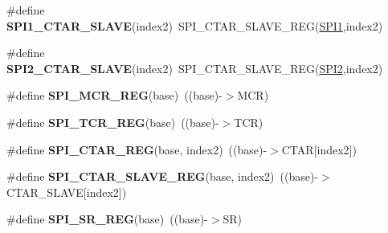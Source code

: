 \begin{DoxyCompactItemize}
\item 
\#define {\bfseries S\+P\+I1\+\_\+\+C\+T\+A\+R\+\_\+\+S\+L\+A\+VE}(index2)~S\+P\+I\+\_\+\+C\+T\+A\+R\+\_\+\+S\+L\+A\+V\+E\+\_\+\+R\+EG(\hyperlink{group__SPI__Peripheral__Access__Layer_gad483be344a28ac800be8f03654a9612f}{S\+P\+I1},index2)\hypertarget{group__SPI__Register__Accessor__Macros_ga361579ce18b530b397c5de3ac7f0901d}{}\label{group__SPI__Register__Accessor__Macros_ga361579ce18b530b397c5de3ac7f0901d}

\item 
\#define {\bfseries S\+P\+I2\+\_\+\+C\+T\+A\+R\+\_\+\+S\+L\+A\+VE}(index2)~S\+P\+I\+\_\+\+C\+T\+A\+R\+\_\+\+S\+L\+A\+V\+E\+\_\+\+R\+EG(\hyperlink{group__SPI__Peripheral__Access__Layer_gaf2c3d8ce359dcfbb2261e07ed42af72b}{S\+P\+I2},index2)\hypertarget{group__SPI__Register__Accessor__Macros_ga22f28ca15ffb5162a59cb82e4ff460fd}{}\label{group__SPI__Register__Accessor__Macros_ga22f28ca15ffb5162a59cb82e4ff460fd}

\item 
\#define {\bfseries S\+P\+I\+\_\+\+M\+C\+R\+\_\+\+R\+EG}(base)~((base)-\/$>$M\+CR)\hypertarget{group__SPI__Register__Accessor__Macros_ga02f3e3aa90fc1cdfb071320ce19987ac}{}\label{group__SPI__Register__Accessor__Macros_ga02f3e3aa90fc1cdfb071320ce19987ac}

\item 
\#define {\bfseries S\+P\+I\+\_\+\+T\+C\+R\+\_\+\+R\+EG}(base)~((base)-\/$>$T\+CR)\hypertarget{group__SPI__Register__Accessor__Macros_ga59171d40915f579f0444e2036c67d9f5}{}\label{group__SPI__Register__Accessor__Macros_ga59171d40915f579f0444e2036c67d9f5}

\item 
\#define {\bfseries S\+P\+I\+\_\+\+C\+T\+A\+R\+\_\+\+R\+EG}(base,  index2)~((base)-\/$>$C\+T\+AR\mbox{[}index2\mbox{]})\hypertarget{group__SPI__Register__Accessor__Macros_gacbd9cd0fec440c317a022bcf3648af57}{}\label{group__SPI__Register__Accessor__Macros_gacbd9cd0fec440c317a022bcf3648af57}

\item 
\#define {\bfseries S\+P\+I\+\_\+\+C\+T\+A\+R\+\_\+\+S\+L\+A\+V\+E\+\_\+\+R\+EG}(base,  index2)~((base)-\/$>$C\+T\+A\+R\+\_\+\+S\+L\+A\+VE\mbox{[}index2\mbox{]})\hypertarget{group__SPI__Register__Accessor__Macros_ga8cc645b8d22dd9721ab6fa01357b2d8f}{}\label{group__SPI__Register__Accessor__Macros_ga8cc645b8d22dd9721ab6fa01357b2d8f}

\item 
\#define {\bfseries S\+P\+I\+\_\+\+S\+R\+\_\+\+R\+EG}(base)~((base)-\/$>$SR)\hypertarget{group__SPI__Register__Accessor__Macros_ga0e3d3fae279a7f98aec5aebeb1c6b0bb}{}\label{group__SPI__Register__Accessor__Macros_ga0e3d3fae279a7f98aec5aebeb1c6b0bb}


\end{DoxyCompactItemize}
